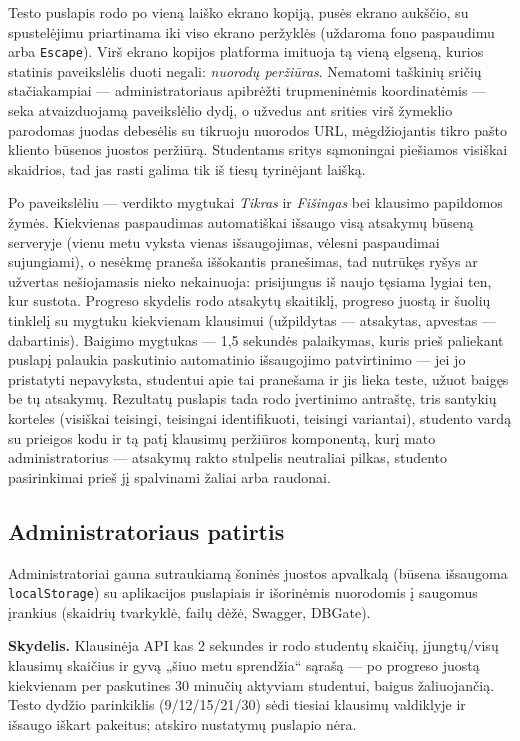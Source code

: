 \documentclass[11pt,a4paper]{article}
\newcommand{\code}[1]{\texttt{#1}}
\begin{document}
Testo puslapis rodo po vieną laiško ekrano kopiją, pusės ekrano
aukščio, su spustelėjimu priartinama iki viso ekrano peržyklės
(uždaroma fono paspaudimu arba \code{Escape}). Virš ekrano kopijos
platforma imituoja tą vieną elgseną, kurios statinis paveikslėlis
duoti negali: \emph{nuorodų peržiūras}. Nematomi taškinių sričių
stačiakampiai — administratoriaus apibrėžti trupmeninėmis
koordinatėmis — seka atvaizduojamą paveikslėlio dydį, o užvedus ant
srities virš žymeklio parodomas juodas debesėlis su tikruoju nuorodos
URL, mėgdžiojantis tikro pašto kliento būsenos juostos peržiūrą.
Studentams sritys sąmoningai piešiamos visiškai skaidrios, tad jas
rasti galima tik iš tiesų tyrinėjant laišką.

Po paveikslėliu — verdikto mygtukai \emph{Tikras} ir \emph{Fišingas}
bei klausimo papildomos žymės. Kiekvienas paspaudimas automatiškai
išsaugo visą atsakymų būseną serveryje (vienu metu vyksta vienas
išsaugojimas, vėlesni paspaudimai sujungiami), o nesėkmę praneša
iššokantis pranešimas, tad nutrūkęs ryšys ar užvertas nešiojamasis
nieko nekainuoja: prisijungus iš naujo tęsiama lygiai ten, kur
sustota. Progreso skydelis rodo atsakytų skaitiklį, progreso juostą
ir šuolių tinklelį su mygtuku kiekvienam klausimui (užpildytas —
atsakytas, apvestas — dabartinis). Baigimo mygtukas — 1,5 sekundės
palaikymas, kuris prieš paliekant puslapį palaukia paskutinio
automatinio išsaugojimo patvirtinimo — jei jo pristatyti nepavyksta,
studentui apie tai pranešama ir jis lieka teste, užuot baigęs be tų
atsakymų. Rezultatų puslapis tada rodo įvertinimo antraštę, tris
santykių korteles (visiškai teisingi, teisingai identifikuoti,
teisingi variantai), studento vardą su prieigos kodu ir tą patį
klausimų peržiūros komponentą, kurį mato administratorius — atsakymų
rakto stulpelis neutraliai pilkas, studento pasirinkimai prieš jį
spalvinami žaliai arba raudonai.

\subsection{Administratoriaus patirtis}
\label{sec:adminui}

Administratoriai gauna sutraukiamą šoninės juostos apvalkalą (būsena
išsaugoma \code{localStorage}) su aplikacijos puslapiais ir išorinėmis
nuorodomis į saugomus įrankius (skaidrių tvarkyklė, failų dėžė,
Swagger, DBGate).

\textbf{Skydelis.} Klausinėja API kas 2 sekundes ir rodo studentų
skaičių, įjungtų/visų klausimų skaičius ir gyvą „šiuo metu
sprendžia`` sąrašą — po progreso juostą kiekvienam per paskutines 30
minučių aktyviam studentui, baigus žaliuojančią. Testo dydžio
parinkiklis (9/12/15/21/30) sėdi tiesiai klausimų valdiklyje ir
išsaugo iškart pakeitus; atskiro nustatymų puslapio nėra.
\end{document}
